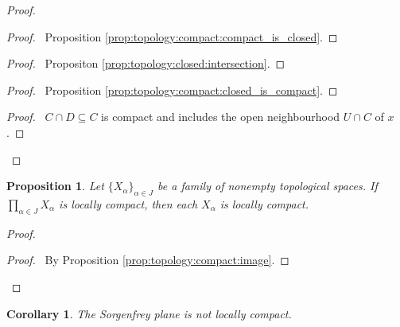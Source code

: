 \documentclass{report}
\let\qed\relax
\newtheorem{prop}[lm]{Proposition}
\newtheorem{cor}{Corollary}[lm]
\theoremstyle{definition}
\begin{document}
  \begin{proof}
    \pf
    \begin{proof}
      \pf\ Proposition \ref{prop:topology:compact:compact_is_closed}.
    \end{proof}
    \begin{proof}
      \pf\ Propositon \ref{prop:topology:closed:intersection}.
    \end{proof}
    \begin{proof}
      \pf\ Proposition \ref{prop:topology:compact:closed_is_compact}.
    \end{proof}
    \qedstep
    \begin{proof}
      \pf\ $C \cap D \subseteq C$ is compact and includes the open
      neighbourhood
      $U \cap C$ of $x$.
    \end{proof}
    \qed
  \end{proof}

   \begin{prop}
   Let $\{X_\alpha\}_{\alpha \in J}$ be a family of nonempty topological
spaces. If    $\prod_{\alpha \in J} X_\alpha$ is locally compact, then each
$X_\alpha$ is locally compact.
 \end{prop}

 \begin{proof}
  \pf
  \begin{proof}
    \pf\ By Proposition \ref{prop:topology:compact:image}.
  \end{proof}
  \qed
 \end{proof}

 \begin{cor}
  The Sorgenfrey plane is not locally compact.
 \end{cor}
\end{document}

